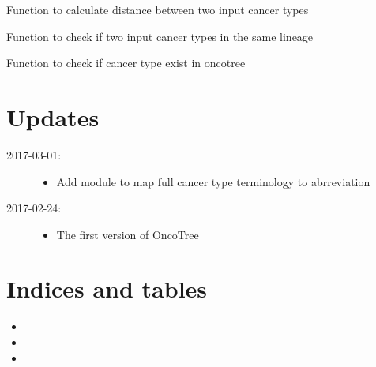 \documentclass[letterpaper,10pt,english]{sphinxmanual}
\begin{document}
\begin{fulllineitems}
\begin{fulllineitems}
\label{API:OncoTree.OncoTree.OncoTree.distance}
Function to calculate distance between two input cancer types

\end{fulllineitems}


\begin{fulllineitems}
\label{API:OncoTree.OncoTree.OncoTree.homo}
Function to check if two input cancer types in the same lineage

\end{fulllineitems}


\begin{fulllineitems}
\label{API:OncoTree.OncoTree.OncoTree.inclusion}
Function to check if cancer type exist in oncotree

\end{fulllineitems}


\end{fulllineitems}



\chapter{Updates}
\label{index:updates}\begin{description}
\item[{2017-03-01:}] \leavevmode\begin{itemize}
\item {} 
Add {\hyperref[API:oncotree]{}} module to map full cancer type terminology to abrreviation

\end{itemize}

\item[{2017-02-24:}] \leavevmode\begin{itemize}
\item {} 
The first version of OncoTree

\end{itemize}

\end{description}


\chapter{Indices and tables}
\label{index:indices-and-tables}\begin{itemize}
\item {} 

\item {} 

\item {} 

\end{itemize}



\renewcommand{\indexname}{Index}
\printindex
\end{document}
